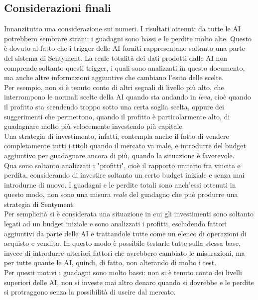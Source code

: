 \documentclass[a4paper,12pt]{report}
\begin{document}
\begin{fig}
\subsection{Considerazioni finali}
Innanzitutto una considerazione sui numeri. I risultati ottenuti da tutte le AI potrebbero sembrare strani: i guadagni sono bassi e le perdite molto alte. Questo è dovuto al fatto che i trigger delle AI forniti rappresentano soltanto una parte del sistema di Sentyment. La reale totalità dei dati prodotti dalle AI non comprende soltanto questi trigger, i quali sono analizzati in questo documento, ma anche altre informazioni aggiuntive che cambiano l'esito delle scelte.\\Per esempio, non si è tenuto conto di altri segnali di livello più alto, che interrompono le normali scelte della AI quando sta andando in \textit{leva}, cioè quando il profitto sta scendendo troppo sotto una certa soglia scelta, oppure dei suggerimenti che permettono, quando il profitto è particolarmente alto, di guadagnare molto più velocemente investendo più capitale.\\ Una strategia di investimento, infatti, contempla anche il fatto di vendere completamente tutti i titoli quando il mercato va male, e introdurre del budget aggiuntivo per guadagnare ancora di più, quando la situazione è favorevole.\\ Qua sono soltanto analizzati i "profitti", cioè il rapporto unitario fra vincita e perdita, considerando di investire soltanto un certo budget iniziale e senza mai introdurne di nuovo. I guadagni e le perdite totali sono anch'essi ottenuti in questo modo, non sono una misura \textit{reale} del guadagno che può produrre una strategia di Sentyment.\\ Per semplicità si è considerata una situazione in cui gli investimenti sono soltanto legati ad un budget iniziale e sono analizzati i profitti, escludendo fattori aggiuntivi da parte delle AI e trattandole tutte come un elenco di operazioni di acquisto e vendita. In questo modo è possibile testarle tutte sulla stessa base, invece di introdurre ulteriori fattori che avrebbero cambiato le misurazioni, ma per tutte quante le AI, quindi, di fatto, non alterando di molto i test.\\Per questi motivi i guadagni sono molto bassi: non si è tenuto conto dei livelli superiori delle AI, non si investe mai altro denaro quando si dovrebbe e le perdite si protraggono senza la possibilità di uscire dal mercato.\\~\\

\end{fig}
\end{document}
